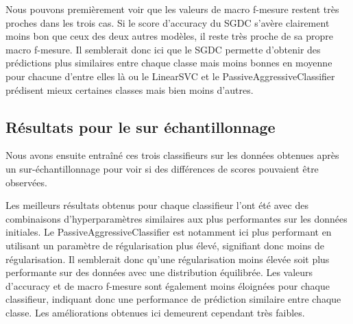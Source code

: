 \documentclass[11pt]{article}
\begin{document}
Nous pouvons premièrement voir que les valeurs de macro f-mesure restent très proches dans les trois cas. Si le score d'accuracy du SGDC s'avère clairement moins bon que ceux des deux autres modèles, il reste très proche de sa propre macro f-mesure. Il semblerait donc ici que le SGDC permette d'obtenir des prédictions plus similaires entre chaque classe mais moins bonnes en moyenne pour chacune d'entre elles là ou le LinearSVC et le PassiveAggressiveClassifier prédisent mieux certaines classes mais bien moins d'autres.

\subsection{Résultats pour le sur échantillonnage}

Nous avons ensuite entraîné ces trois classifieurs sur les données obtenues après un sur-échantillonnage pour voir si des différences de scores pouvaient être observées.

\begin{table}[ht]
\centering
{}
\caption{Meilleurs résultats obtenus après sur échantillonnage.}
\label{tab:pourcentage_test}
\end{table}

Les meilleurs résultats obtenus pour chaque classifieur l'ont été avec des combinaisons d'hyperparamètres similaires aux plus performantes sur les données initiales. Le PassiveAggressiveClassifier est notamment ici plus performant en utilisant un paramètre de régularisation plus élevé, signifiant donc moins de régularisation. Il semblerait donc qu'une régularisation moins élevée soit plus performante sur des données avec une distribution équilibrée. Les valeurs d'accuracy et de macro f-mesure sont également moins éloignées pour chaque classifieur, indiquant donc une performance de prédiction similaire entre chaque classe. Les améliorations obtenues ici demeurent cependant très faibles.
\end{document}
